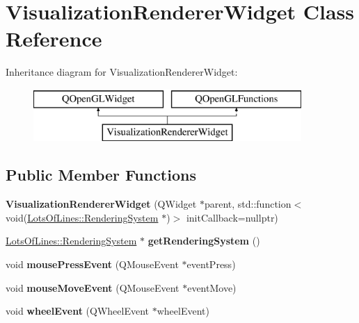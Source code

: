 \hypertarget{class_visualization_renderer_widget}{}\section{Visualization\+Renderer\+Widget Class Reference}
\label{class_visualization_renderer_widget}
Inheritance diagram for Visualization\+Renderer\+Widget\+:\begin{figure}[H]
\begin{center}
\leavevmode
\includegraphics[height=2.000000cm]{class_visualization_renderer_widget}
\end{center}
\end{figure}
\subsection*{Public Member Functions}
\begin{DoxyCompactItemize}
\item 
{\bfseries Visualization\+Renderer\+Widget} (Q\+Widget $\ast$parent, std\+::function$<$ void(\hyperlink{class_lots_of_lines_1_1_rendering_system}{Lots\+Of\+Lines\+::\+Rendering\+System} $\ast$)$>$ init\+Callback=nullptr)\hypertarget{class_visualization_renderer_widget_a36920af3f1a80d491d14b48403f8656c}{}\label{class_visualization_renderer_widget_a36920af3f1a80d491d14b48403f8656c}

\item 
\hyperlink{class_lots_of_lines_1_1_rendering_system}{Lots\+Of\+Lines\+::\+Rendering\+System} $\ast$ {\bfseries get\+Rendering\+System} ()\hypertarget{class_visualization_renderer_widget_aa60e141abdbf2bbe2b157d784dabf73f}{}\label{class_visualization_renderer_widget_aa60e141abdbf2bbe2b157d784dabf73f}

\item 
void {\bfseries mouse\+Press\+Event} (Q\+Mouse\+Event $\ast$event\+Press)\hypertarget{class_visualization_renderer_widget_a4fec26286e0ce950e0fa001768d30772}{}\label{class_visualization_renderer_widget_a4fec26286e0ce950e0fa001768d30772}

\item 
void {\bfseries mouse\+Move\+Event} (Q\+Mouse\+Event $\ast$event\+Move)\hypertarget{class_visualization_renderer_widget_afd19b29b8e6ac4beeab2fcf460705073}{}\label{class_visualization_renderer_widget_afd19b29b8e6ac4beeab2fcf460705073}

\item 
void {\bfseries wheel\+Event} (Q\+Wheel\+Event $\ast$wheel\+Event)\hypertarget{class_visualization_renderer_widget_ae0b33c7ba9b3d56ad709dfbd43bc7a8a}{}\label{class_visualization_renderer_widget_ae0b33c7ba9b3d56ad709dfbd43bc7a8a}

\end{DoxyCompactItemize}
